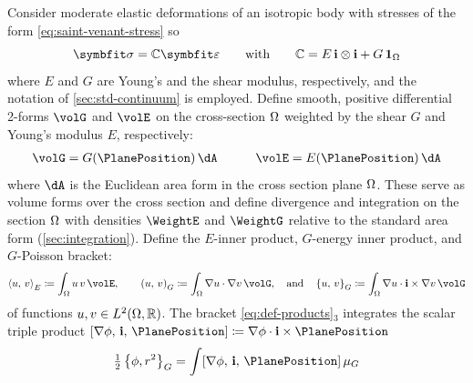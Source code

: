 Consider moderate elastic deformations of an isotropic body with stresses of the form \eqref{eq:saint-venant-stress} so 
\begin{equation*}
    \bm{\sigma} = \mathbb{C}\bm{\varepsilon}
    \qquad\text{with}\qquad 
    \mathbb{C} = E \, \FrameBasis \otimes \FrameBasis + G \, \oneS
\end{equation*}
where \(E\) and \(G\) are Young's and the shear modulus, respectively, and the notation of \cref{sec:std-continuum} is employed. 
Define smooth, positive differential 2-forms \( \volG \) and \( \volE \)  on the cross-section \( \Omega\) weighted by the shear \(G\) and Young's modulus \(E\), respectively:
\[
\begin{aligned}
    \volG &= G(\PlanePosition)\,\dA
    &\qquad
    \volE &= E(\PlanePosition)\,\dA \\
\end{aligned}
\]
where \(\dA\) is the Euclidean area form in the cross section plane \(\Omega\). 
These serve as volume forms over the cross section and define divergence and  integration on the section $\Omega$ with densities $\WeightE$ and $\WeightG$ relative to the standard area form (\cref{sec:integration}). 
Define the \(E\)-inner product, \(G\)-energy inner product, and \(G\)-Poisson bracket:
\begin{equation}
\left<u,\, v\right>_E \coloneq \int_{\Section} u \, v \, \volE,
\qquad
\left(u,\, v\right)_G \coloneq \int_{\Section} \nabla u \cdot \nabla v \, \volG,
\quad \text{and}\quad 
\left\{u,\, v\right\}_G \coloneq \int_{\Section} \nabla u \cdot \FrameBasis \times \nabla v\, \volG
\label{eq:def-products}
\end{equation}
of functions \(u,v\in L^{2}(\Omega,\mathbb{R})\). 
The bracket \eqref{eq:def-products}$_3$ integrates the scalar triple product \([\nabla \phi,\, \FrameBasis,\, \PlanePosition] \coloneq \nabla \phi \cdot \FrameBasis \times \PlanePosition\)
\begin{equation*}
\tfrac{1}{2}\left\{\phi, r^2\right\}_G = \int [\nabla \phi,\, \FrameBasis,\, \PlanePosition]\, \mu_G
\end{equation*}


